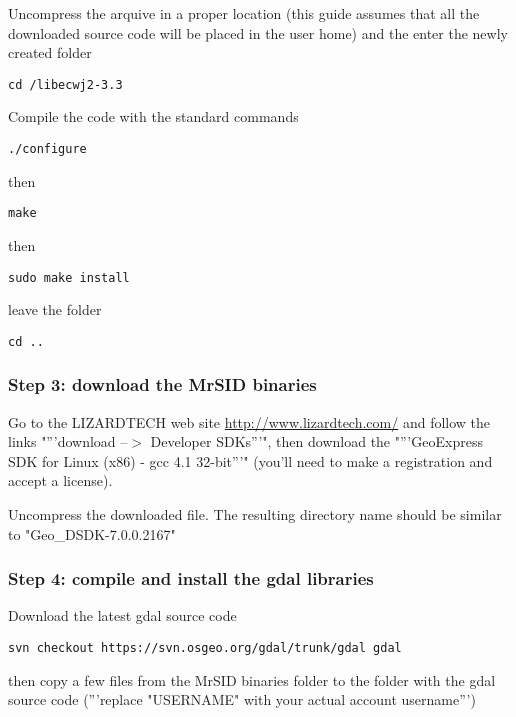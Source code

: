 Uncompress the arquive in a proper location (this guide assumes 
that all the downloaded source code will be placed in the user home) 
and the enter the newly created folder

\begin{verbatim}
cd /libecwj2-3.3
\end{verbatim}

Compile the code with the standard commands

\begin{verbatim}
./configure
\end{verbatim}

then

\begin{verbatim}
make
\end{verbatim}

then

\begin{verbatim}
sudo make install
\end{verbatim}

leave the folder 

\begin{verbatim}
cd ..
\end{verbatim}

\subsubsection{Step 3: download the MrSID binaries}
Go to the LIZARDTECH web site \url{http://www.lizardtech.com/} and follow the links
"'''download --$>$ Developer SDKs'''", 
then download the "'''GeoExpress SDK for Linux (x86) - gcc 4.1 32-bit'''"
(you'll need to make a registration and accept a license).

Uncompress the downloaded file. The resulting directory name should be similar to "Geo\_DSDK-7.0.0.2167"

\subsubsection{Step 4: compile and install the gdal libraries}
Download the latest gdal source code

\begin{verbatim}
svn checkout https://svn.osgeo.org/gdal/trunk/gdal gdal
\end{verbatim}

then copy a few files from the MrSID binaries folder to the folder with the gdal source code
('''replace "USERNAME" with your actual account username''')

